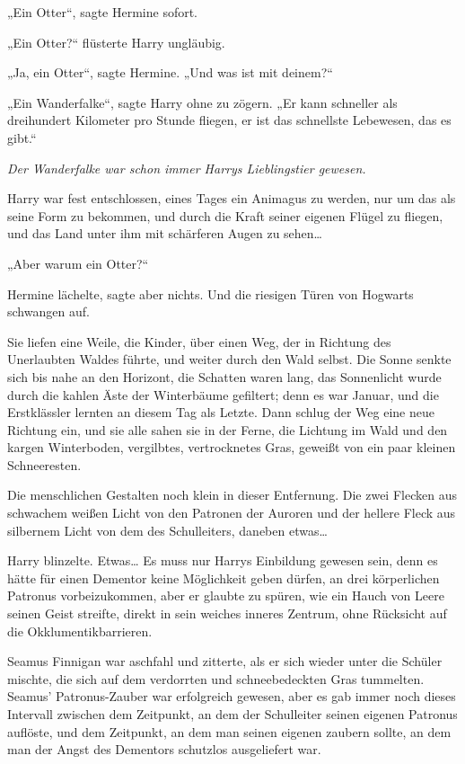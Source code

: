 {„Ein Otter“, sagte Hermine sofort.

„Ein Otter?“ flüsterte Harry ungläubig.

„Ja, ein Otter“, sagte Hermine. „Und was ist mit deinem?“

„Ein Wanderfalke“, sagte Harry ohne zu zögern. „Er kann schneller als dreihundert Kilometer pro Stunde fliegen, er ist das schnellste Lebewesen, das es gibt.“

\emph{Der Wanderfalke war schon immer Harrys Lieblingstier gewesen.}

Harry war fest entschlossen, eines Tages ein Animagus zu werden, nur um das als seine Form zu bekommen, und durch die Kraft seiner eigenen Flügel zu fliegen, und das Land unter ihm mit schärferen Augen zu sehen…

„Aber warum ein Otter?“

Hermine lächelte, sagte aber nichts. Und die riesigen Türen von Hogwarts schwangen auf.

Sie liefen eine Weile, die Kinder, über einen Weg, der in Richtung des Unerlaubten Waldes führte, und weiter durch den Wald selbst. Die Sonne senkte sich bis nahe an den Horizont, die Schatten waren lang, das Sonnenlicht wurde durch die kahlen Äste der Winterbäume gefiltert; denn es war Januar, und die Erstklässler lernten an diesem Tag als Letzte. Dann schlug der Weg eine neue Richtung ein, und sie alle sahen sie in der Ferne, die Lichtung im Wald und den kargen Winterboden, vergilbtes, vertrocknetes Gras, geweißt von ein paar kleinen Schneeresten.

Die menschlichen Gestalten noch klein in dieser Entfernung. Die zwei Flecken aus schwachem weißen Licht von den Patronen der Auroren und der hellere Fleck aus silbernem Licht von dem des Schulleiters, daneben etwas…

Harry blinzelte. Etwas… Es muss nur Harrys Einbildung gewesen sein, denn es hätte für einen Dementor keine Möglichkeit geben dürfen, an drei körperlichen Patronus vorbeizukommen, aber er glaubte zu spüren, wie ein Hauch von Leere seinen Geist streifte, direkt in sein weiches inneres Zentrum, ohne Rücksicht auf die Okklumentikbarrieren.

Seamus Finnigan war aschfahl und zitterte, als er sich wieder unter die Schüler mischte, die sich auf dem verdorrten und schneebedeckten Gras tummelten. Seamus' Patronus-Zauber war erfolgreich gewesen, aber es gab immer noch dieses Intervall zwischen dem Zeitpunkt, an dem der Schulleiter seinen eigenen Patronus auflöste, und dem Zeitpunkt, an dem man seinen eigenen zaubern sollte, an dem man der Angst des Dementors schutzlos ausgeliefert war.

}
